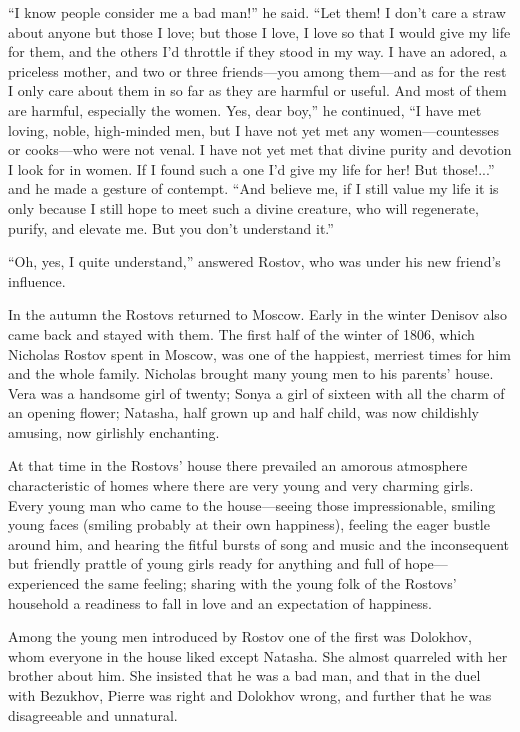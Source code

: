 ``I know people consider me a bad man!'' he said. ``Let them! I
don't care a straw about anyone but those I love; but those I
love, I love so that I would give my life for them, and the
others I'd throttle if they stood in my way. I have an adored, a
priceless mother, and two or three friends---you among them---and
as for the rest I only care about them in so far as they are
harmful or useful. And most of them are harmful, especially the
women. Yes, dear boy,'' he continued, ``I have met loving, noble,
high-minded men, but I have not yet met any women---countesses or
cooks---who were not venal. I have not yet met that divine purity
and devotion I look for in women. If I found such a one I'd give
my life for her! But those!...'' and he made a gesture of
contempt. ``And believe me, if I still value my life it is only
because I still hope to meet such a divine creature, who will
regenerate, purify, and elevate me. But you don't understand
it.''

``Oh, yes, I quite understand,'' answered Rostov, who was under
his new friend's influence.

In the autumn the Rostovs returned to Moscow. Early in the winter
Denisov also came back and stayed with them. The first half of
the winter of 1806, which Nicholas Rostov spent in Moscow, was
one of the happiest, merriest times for him and the whole
family. Nicholas brought many young men to his parents'
house. Vera was a handsome girl of twenty; Sonya a girl of
sixteen with all the charm of an opening flower; Natasha, half
grown up and half child, was now childishly amusing, now
girlishly enchanting.

At that time in the Rostovs' house there prevailed an amorous
atmosphere characteristic of homes where there are very young and
very charming girls. Every young man who came to the
house---seeing those impressionable, smiling young faces (smiling
probably at their own happiness), feeling the eager bustle around
him, and hearing the fitful bursts of song and music and the
inconsequent but friendly prattle of young girls ready for
anything and full of hope---experienced the same feeling; sharing
with the young folk of the Rostovs' household a readiness to fall
in love and an expectation of happiness.

Among the young men introduced by Rostov one of the first was
Dolokhov, whom everyone in the house liked except Natasha. She
almost quarreled with her brother about him. She insisted that he
was a bad man, and that in the duel with Bezukhov, Pierre was
right and Dolokhov wrong, and further that he was disagreeable
and unnatural.

